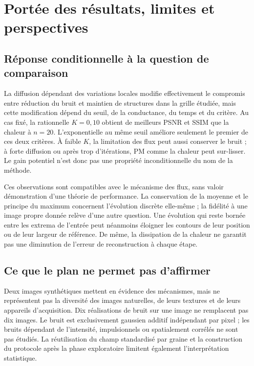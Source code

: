 \section{Portée des résultats, limites et perspectives}
\label{sec:discussion}

\subsection{Réponse conditionnelle à la question de comparaison}

La diffusion dépendant des variations locales modifie effectivement le
compromis entre réduction du bruit et maintien de structures dans la
grille étudiée, mais cette modification dépend du seuil, de la conductance,
du temps et du critère. Au cas fixé, la rationnelle $K=0{,}10$ obtient
de meilleurs PSNR et SSIM que la chaleur à $n=20$. L'exponentielle au
même seuil améliore seulement le premier de ces deux critères.
À faible $K$, la limitation des flux peut aussi conserver le bruit ;
à forte diffusion ou après trop d'itérations, PM comme la chaleur peut
sur-lisser. Le gain potentiel n'est donc pas une propriété inconditionnelle
du nom de la méthode.

Ces observations sont compatibles avec le mécanisme des flux, sans
valoir démonstration d'une théorie de performance. La conservation de
la moyenne et le principe du maximum concernent l'évolution discrète
elle-même ; la fidélité à une image propre donnée relève d'une autre
question. Une évolution qui reste bornée entre les extrema de l'entrée
peut néanmoins éloigner les contours de leur position ou de leur largeur
de référence. De même, la dissipation de la chaleur ne garantit pas une
diminution de l'erreur de reconstruction à chaque étape.

\subsection{Ce que le plan ne permet pas d'affirmer}

Deux images synthétiques mettent en évidence des mécanismes, mais ne
représentent pas la diversité des images naturelles, de leurs textures
et de leurs appareils d'acquisition. Dix réalisations de bruit sur une
image ne remplacent pas dix images. Le bruit est exclusivement gaussien
additif indépendant par pixel ; les bruits dépendant de l'intensité,
impulsionnels ou spatialement corrélés ne sont pas étudiés. La réutilisation
du champ standardisé par graine et la construction du protocole après
la phase exploratoire limitent également l'interprétation statistique.

